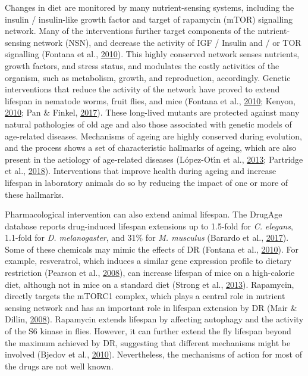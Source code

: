 \documentclass[12pt,twoside]{unicam}
\begin{document}
Changes in diet are monitored by many nutrient-sensing systems, including the insulin / insulin-like growth factor and target of rapamycin (mTOR) signalling network. Many of the interventions further target components of the nutrient-sensing network (NSN), and decrease the activity of IGF / Insulin and / or TOR signalling (Fontana et al., \protect\hyperlink{ref-Fontana2010}{2010}). This highly conserved network senses nutrients, growth factors, and stress status, and modulates the costly activities of the organism, such as metabolism, growth, and reproduction, accordingly. Genetic interventions that reduce the activity of the network have proved to extend lifespan in nematode worms, fruit flies, and mice (Fontana et al., \protect\hyperlink{ref-Fontana2010}{2010}; Kenyon, \protect\hyperlink{ref-Kenyon2010}{2010}; Pan \& Finkel, \protect\hyperlink{ref-Pan2017}{2017}). These long-lived mutants are protected against many natural pathologies of old age and also those associated with genetic models of age-related diseases. Mechanisms of ageing are highly conserved during evolution, and the process shows a set of characteristic hallmarks of ageing, which are also present in the aetiology of age-related diseases (López-Otı́n et al., \protect\hyperlink{ref-Lopez-Otin2013}{2013}; Partridge et al., \protect\hyperlink{ref-Partridge2018}{2018}). Interventions that improve health during ageing and increase lifespan in laboratory animals do so by reducing the impact of one or more of these hallmarks.

Pharmacological intervention can also extend animal lifespan. The DrugAge database reports drug-induced lifespan extensions up to 1.5-fold for \emph{C. elegans}, 1.1-fold for \emph{D. melanogaster}, and 31\% for \emph{M. musculus} (Barardo et al., \protect\hyperlink{ref-Barardo2017}{2017}). Some of these chemicals may mimic the effects of DR (Fontana et al., \protect\hyperlink{ref-Fontana2010}{2010}). For example, resveratrol, which induces a similar gene expression profile to dietary restriction (Pearson et al., \protect\hyperlink{ref-Pearson2008}{2008}), can increase lifespan of mice on a high-calorie diet, although not in mice on a standard diet (Strong et al., \protect\hyperlink{ref-Strong2013}{2013}). Rapamycin, directly targets the mTORC1 complex, which plays a central role in nutrient sensing network and has an important role in lifespan extension by DR (Mair \& Dillin, \protect\hyperlink{ref-Mair2008}{2008}). Rapamycin extends lifespan by affecting autophagy and the activity of the S6 kinase in flies. However, it can further extend the fly lifespan beyond the maximum achieved by DR, suggesting that different mechanisms might be involved (Bjedov et al., \protect\hyperlink{ref-Bjedov2010}{2010}). Nevertheless, the mechanisms of action for most of the drugs are not well known.
\end{document}
